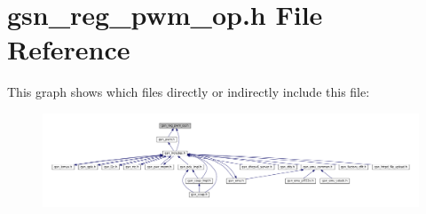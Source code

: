 \hypertarget{a00564}{
\section{gsn\_\-reg\_\-pwm\_\-op.h File Reference}
\label{a00564}
}
This graph shows which files directly or indirectly include this file:
\nopagebreak
\begin{figure}[H]
\begin{center}
\leavevmode
\includegraphics[width=400pt]{a00801}
\end{center}
\end{figure}
